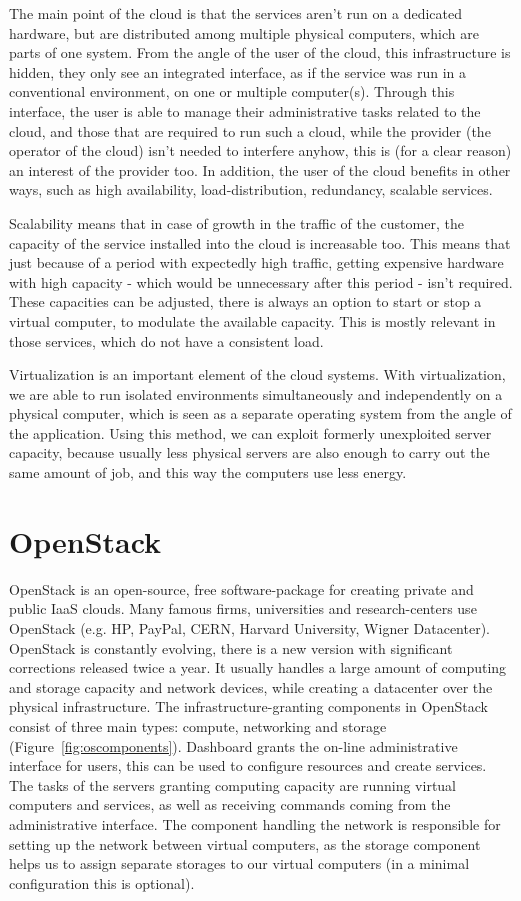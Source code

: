 \documentclass[a4paper]{article}
\begin{document}
The main point of the cloud is that the services aren't run on a dedicated hardware, but are distributed among multiple physical computers, which are parts of one system.  From the angle of the user of the cloud, this infrastructure is hidden, they only see an integrated interface, as if the service was run in a conventional environment, on one or multiple computer(s). Through this interface, the user is able to manage their administrative tasks related to the cloud, and those that are required to run such a cloud, while the provider (the operator of the cloud) isn't needed to interfere anyhow, this is (for a clear reason) an interest of the provider too. In addition, the user of the cloud benefits in other ways, such as high availability, load-distribution, redundancy, scalable services.


Scalability means that in case of growth in the traffic of the customer, the capacity of the service installed into the cloud is increasable too. This means that just because of a period with expectedly high traffic, getting expensive hardware with high capacity - which would be unnecessary after this period - isn't required. These capacities can be adjusted, there is always an option to start or stop a virtual computer, to modulate the available capacity. This is mostly relevant in those services, which do not have a consistent load.


Virtualization is an important element of the cloud systems. With virtualization, we are able to run isolated environments simultaneously and independently on a physical computer, which is seen as a separate operating system from the angle of the application. Using this method, we can exploit formerly unexploited server capacity, because usually less physical servers are also enough to carry out the same amount of job, and this way the computers use less energy.


\section{OpenStack}

OpenStack is an open-source, free software-package for creating private and public IaaS clouds. Many famous firms, universities and research-centers use OpenStack (e.g. HP, PayPal, CERN, Harvard University, Wigner Datacenter). OpenStack is constantly evolving, there is a new version with significant corrections released twice a year. It usually handles a large amount of computing and storage capacity and network devices, while creating a datacenter over the physical infrastructure. The infrastructure-granting components in OpenStack consist of three main types: compute, networking and storage (Figure~\ref{fig:oscomponents}). Dashboard grants the on-line administrative interface for users, this can be used to configure resources and create services. The tasks of the servers granting computing capacity are running virtual computers and services, as well as receiving commands coming from the administrative interface. The component handling the network is responsible for setting up the network between virtual computers, as the storage component helps us to assign separate storages to our virtual computers (in a minimal configuration this is optional).
\end{document}
